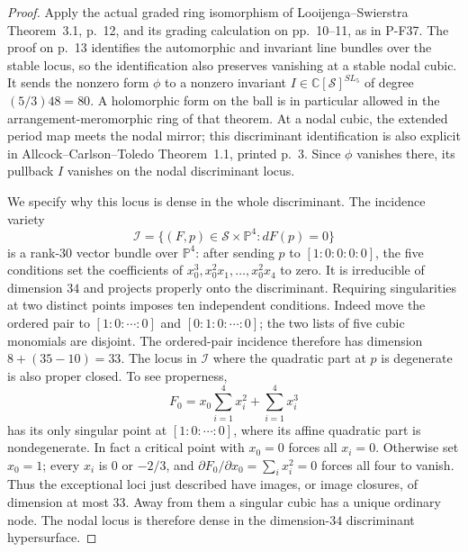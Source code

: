 \begin{proof}
Apply the actual graded ring isomorphism of
Looijenga--Swierstra Theorem~3.1, p.~12, and its grading
calculation on pp.~10--11, as in P-F37. The proof on p.~13
identifies the automorphic and invariant line bundles over
the stable locus, so the identification also preserves
vanishing at a stable nodal cubic.
It sends the nonzero form $\phi$ to a nonzero invariant
$I\in\mathbb C[\mathscr S]^{SL_5}$ of degree
$(5/3)48=80$. A holomorphic form on the ball is in particular
allowed in the arrangement-meromorphic ring of that theorem.
At a nodal cubic, the extended period map meets the nodal
mirror; this discriminant identification is also explicit
in Allcock--Carlson--Toledo Theorem~1.1, printed p.~3.
Since $\phi$ vanishes there, its pullback $I$
vanishes on the nodal discriminant locus.

We specify why this locus is dense in the whole discriminant.
The incidence variety
\[
 \mathscr I=\{(F,p)\in\mathscr S\times\mathbb P^4:
                         dF(p)=0\}
\]
is a rank-$30$ vector bundle over $\mathbb P^4$: after sending
$p$ to $[1:0:0:0:0]$, the five conditions set the coefficients
of $x_0^3,x_0^2x_1,\ldots,x_0^2x_4$ to zero.
It is irreducible of dimension $34$ and projects properly
onto the discriminant. Requiring singularities at two
distinct points imposes ten independent conditions. Indeed
move the ordered pair to $[1:0:\cdots:0]$ and
$[0:1:0:\cdots:0]$; the two lists of five cubic monomials
are disjoint. The ordered-pair incidence therefore has
dimension $8+(35-10)=33$.
The locus in $\mathscr I$ where the quadratic part at $p$
is degenerate is also proper closed. To see properness,
\[
        F_0=x_0\sum_{i=1}^4x_i^2+\sum_{i=1}^4x_i^3
 \tag{P-F41d}
\]
has its only singular point at $[1:0:\cdots:0]$, where its
affine quadratic part is nondegenerate. In fact a critical
point with $x_0=0$ forces all $x_i=0$. Otherwise set
$x_0=1$; every $x_i$ is $0$ or $-2/3$, and
$\partial F_0/\partial x_0=\sum_i x_i^2=0$ forces
all four to vanish. Thus the exceptional loci just described
have images, or image closures, of dimension at most $33$.
Away from them a singular cubic has a unique ordinary node.
The nodal locus is therefore dense in the dimension-$34$
discriminant hypersurface.


\end{proof}
